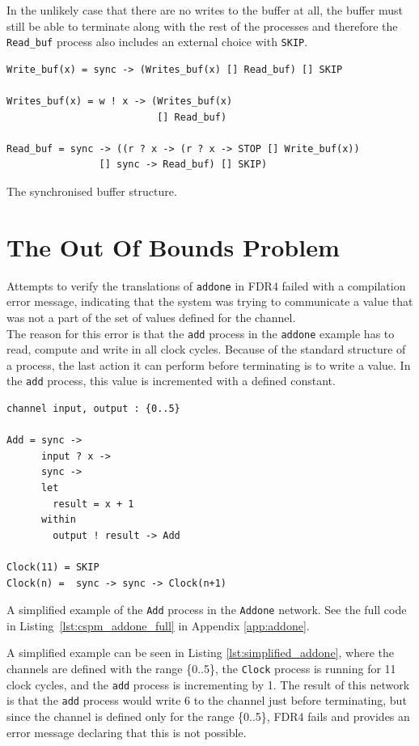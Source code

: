 In the unlikely case that there are no writes to the buffer at all, the buffer must still be able to terminate along with the rest of the processes and therefore the \texttt{Read\_buf} process also includes an external choice with \texttt{SKIP}.

\begin{listing}
\begin{verbatim}
Write_buf(x) = sync -> (Writes_buf(x) [] Read_buf) [] SKIP

Writes_buf(x) = w ! x -> (Writes_buf(x)
                          [] Read_buf)

Read_buf = sync -> ((r ? x -> (r ? x -> STOP [] Write_buf(x))
                [] sync -> Read_buf) [] SKIP)
\end{verbatim}
\caption{The synchronised buffer structure.}
\label{lst:buffer}
\end{listing}

\section{The Out Of Bounds Problem}
Attempts to verify the \cspm{} translations of \texttt{addone} in FDR4 failed with a compilation error message, indicating that the system was trying to communicate a value that was not a part of the set of values defined for the channel. \\

The reason for this error is that the \texttt{add} process in the \texttt{addone} example has to read, compute and write in all clock cycles. Because of the standard structure of a process, the last action it can perform before terminating is to write a value. In the \texttt{add} process, this value is incremented with a defined constant.\\

\begin{listing}
\begin{verbatim}
channel input, output : {0..5}

Add = sync ->
      input ? x ->
      sync ->
      let
        result = x + 1
      within
        output ! result -> Add

Clock(11) = SKIP
Clock(n) =  sync -> sync -> Clock(n+1)
\end{verbatim}
\caption{A simplified example of the \texttt{Add} process in the \texttt{Addone} \cspm{} network. See the full code in Listing~\ref{lst:cspm_addone_full} in Appendix \ref{app:addone}.}
\label{lst:simplified_addone}
\end{listing}
A simplified example can be seen in Listing \ref{lst:simplified_addone}, where the channels are defined with the range \{0..5\}, the \texttt{Clock} process is running for 11 clock cycles, and the \texttt{add} process is incrementing by 1.
The result of this network is that the \texttt{add} process would write 6 to the channel just before terminating, but since the channel is defined only for the range \{0..5\}, FDR4 fails and provides an error message declaring that this is not possible.\\

